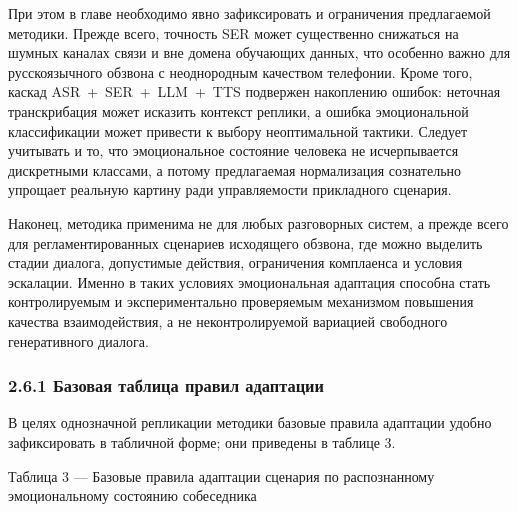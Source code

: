 \documentclass[a4paper,14pt]{extarticle}
\renewcommand{\texttt}[1]{\textnormal{#1}}
\newcommand{\VkrTableCaption}[1]{%
  \Needspace{0.44\textheight}%
  \par\smallskip
  {\singlespacing\noindent #1\par}%
  \vspace{2pt}%
}
\begin{document}
При этом в главе необходимо явно зафиксировать и ограничения
предлагаемой методики. Прежде всего, точность \texttt{SER} может
существенно снижаться на шумных каналах связи и вне домена обучающих
данных, что особенно важно для русскоязычного обзвона с неоднородным
качеством телефонии. Кроме того, каскад
\texttt{ASR\ +\ SER\ +\ LLM\ +\ TTS} подвержен накоплению ошибок:
неточная транскрибация может исказить контекст реплики, а ошибка
эмоциональной классификации может привести к выбору неоптимальной
тактики. Следует учитывать и то, что эмоциональное состояние человека не
исчерпывается дискретными классами, а потому предлагаемая нормализация
сознательно упрощает реальную картину ради управляемости прикладного
сценария.

Наконец, методика применима не для любых разговорных систем, а прежде
всего для регламентированных сценариев исходящего обзвона, где можно
выделить стадии диалога, допустимые действия, ограничения комплаенса и
условия эскалации. Именно в таких условиях эмоциональная адаптация
способна стать контролируемым и экспериментально проверяемым механизмом
повышения качества взаимодействия, а не неконтролируемой вариацией
свободного генеративного диалога.

\subsubsection{2.6.1 Базовая таблица правил
адаптации}\label{ux431ux430ux437ux43eux432ux430ux44f-ux442ux430ux431ux43bux438ux446ux430-ux43fux440ux430ux432ux438ux43b-ux430ux434ux430ux43fux442ux430ux446ux438ux438}

В целях однозначной репликации методики базовые правила адаптации удобно
зафиксировать в табличной форме; они приведены в таблице 3.

\VkrTableCaption{Таблица 3 --- Базовые правила адаптации сценария по распознанному эмоциональному состоянию собеседника}
\end{document}
